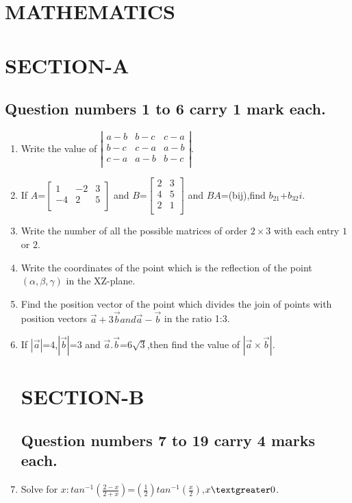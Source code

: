 \documentclass{article}
\begin{document}
\section*{\centering MATHEMATICS}
\section*{\centering SECTION-A}
\subsection*{\centering Question numbers 1 to 6 carry 1 mark each.}
\begin{enumerate}
	\item Write the value of $\left|
		\begin{matrix}
		a-b&b-c&c-a\\
		b-c&c-a&a-b\\
		c-a&a-b&b-c\\
		\end{matrix}
			\right|$.
	\item If $A$=$\left[
			\begin{matrix}
				1&-2&3\\
				-4&2&5\\
			\end{matrix}
		\right]$ and $B$=$\left[
		\begin{matrix}
			2&3\\
			4&5\\
			2&1\\
		\end{matrix} \right]$ and $BA$=(bij),find $b_{21}$+$b_{32}i$.
\item Write the number of all the possible matrices of order $2\times3$ with each entry $1$ or $2$.
\item Write the coordinates of the point which is the reflection of the point $(\alpha,\beta,\gamma)$ in the XZ-plane.
\item Find the position vector of the point which divides the join of points with position vectors $\overset{\rightarrow}{a}+3\overset{\rightarrow}{b} and \overset{\rightarrow}{a}-\overset{\rightarrow}{b}$ in the ratio 1:3.
\item If $|\vec{a}|$=$4$,$|\vec{b}|$=$3$ and $\vec{a}.\vec{b}$=$6\sqrt{3}$,then find the value of $|\vec{a}\times\vec{b}|$. 
\section*{\centering SECTION-B}
\subsection*{\centering Question numbers 7 to 19 carry 4 marks each.}
\item Solve for $x:tan^{-1}\left(\frac{2-x}{2+x}\right)$=$\left(\frac{1}{2}\right)tan^{-1}\left(\frac{x}{2}\right)$,$x \textgreater 0$.

\end{enumerate}
\end{document}
